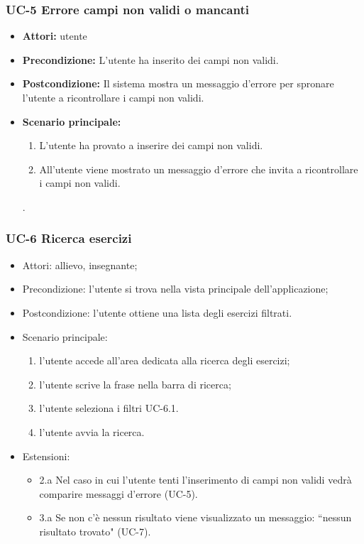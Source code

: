 \subsubsection{UC-5 Errore campi non validi o mancanti}
\begin{itemize}
\item \textbf{Attori: } utente 
\item \textbf{Precondizione: }L'utente ha inserito dei campi non validi.
\item \textbf{Postcondizione: }Il sistema mostra un messaggio d'errore per spronare l'utente a ricontrollare i campi non validi.
\item \textbf{Scenario principale: }
		\begin{enumerate}
		\item L'utente ha provato a inserire dei campi non validi.
		\item All'utente viene mostrato un messaggio d'errore che invita a ricontrollare i campi non validi.
		\end{enumerate}.
\end{itemize}
\subsubsection{UC-6 Ricerca esercizi}
		\begin{itemize}
			\item Attori: allievo, insegnante;
			\item Precondizione: l'utente si trova nella vista principale dell'applicazione;
			\item Postcondizione: l'utente ottiene una lista degli esercizi filtrati.
			\item Scenario principale:
				\begin{enumerate}
					\item l'utente accede all'area dedicata alla ricerca degli esercizi;
					\item l'utente scrive la frase nella barra di ricerca;
					\item l'utente seleziona i filtri UC-6.1.
					\item l'utente avvia la ricerca.
				\end{enumerate}
			\item Estensioni:
				\begin{itemize}
					\item 2.a Nel caso in cui l'utente tenti l'inserimento di campi non validi vedrà comparire messaggi d'errore (UC-5).
					\item 3.a Se non c'è nessun risultato viene visualizzato un messaggio: ``nessun risultato trovato" (UC-7).
				\end{itemize}
		\end{itemize}
